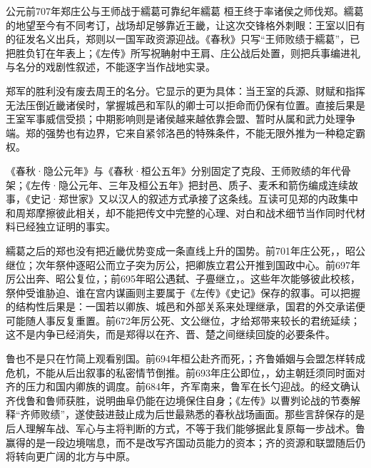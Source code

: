 \begin{event}{公元前707年}{郑庄公与王师战于繻葛}{可靠纪年}{繻葛}
桓王终于率诸侯之师伐郑。繻葛的地望至今有不同考订，战场却足够靠近王畿，让这次交锋格外刺眼：王室以旧有的征发名义出兵，郑则以一国军政资源迎战。《春秋》只写“王师败绩于繻葛”，已把胜负钉在年表上；《左传》所写祝聃射中王肩、庄公战后处置，则把兵事编进礼与名分的戏剧性叙述，不能逐字当作战地实录。

郑军的胜利没有废去周王的名分。它显示的更为具体：当王室的兵源、财赋和指挥无法压倒近畿诸侯时，掌握城邑和军队的卿士可以拒命而仍保有位置。直接后果是王室军事威信受损；中期影响则是诸侯越来越依靠会盟、暂时从属和武力处理争端。郑的强势也有边界，它来自紧邻洛邑的特殊条件，不能无限外推为一种稳定霸权。
\end{event}

\begin{sourcenote}[郑庄公的家事与王事]
《春秋·隐公元年》与《春秋·桓公五年》分别固定了克段、王师败绩的年代骨架；《左传·隐公元年、三年及桓公五年》把封邑、质子、麦禾和箭伤编成连续故事，《史记·郑世家》又以汉人的叙述方式承接了这条线。互读可见郑的内政集中和周郑摩擦彼此相关，却不能把传文中完整的心理、对白和战术细节当作同时代材料已经独立证明的事实。
\end{sourcenote}

繻葛之后的郑也没有把近畿优势变成一条直线上升的国势。前701年庄公死，，昭公继位；次年祭仲逐昭公而立子突为厉公，把卿族立君公开推到国政中心。前697年厉公出奔、昭公复位，；前695年昭公遇弑、子亹继立，。这些年次能够彼此校核，祭仲受谁胁迫、谁在宫内谋画则主要属于《左传》《史记》保存的叙事。可以把握的结构性后果是：一国若以卿族、城邑和外部关系来处理继承，国君的外交承诺便可能随人事反复重置。前672年厉公死、文公继位，才给郑带来较长的君统延续；这不是内争已经消失，而是郑得以在齐、晋、楚之间继续回旋的必要条件。

鲁也不是只在竹简上观看别国。前694年桓公赴齐而死，；齐鲁婚姻与会盟怎样转成危机，不能从后出叙事的私密情节倒推。前693年庄公即位，，幼主朝廷须同时面对齐的压力和国内卿族的调度。前684年，齐军南来，鲁军在长勺迎战。的经文确认齐伐鲁和鲁师获胜，说明曲阜仍能在边境保住自身；《左传》以曹刿论战的节奏解释“齐师败绩”，遂使鼓进鼓止成为后世最熟悉的春秋战场画面。那些言辞保存的是后人理解车战、军心与主将判断的方式，不等于我们能够据此复原每一步战术。鲁赢得的是一段边境喘息，而不是改写齐国动员能力的资本；齐的资源和联盟随后仍将转向更广阔的北方与中原。

